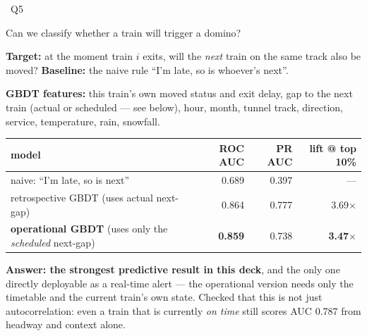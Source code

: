 \documentclass[aspectratio=169,10pt]{beamer}
\newcommand{\srcnote}[1]{{\scriptsize\color{ink3}#1}}
\newcommand{\qtag}[1]{{\scriptsize\color{surface}\colorbox{cblue}{\strut~Q#1~}}}
\begin{document}
\begin{frame}{\qtag{5} Can we classify whether a train will trigger a domino?}
  \textbf{Target:} at the moment train $i$ exits, will the \emph{next} train on the
  same track also be moved? \textbf{Baseline:} the naive rule ``I'm late, so is
  whoever's next''.

  \vspace{0.3em}
  \srcnote{\textbf{GBDT features:} this train's own moved status and exit delay,
  gap to the next train \srcnote{(actual or scheduled --- see below)}, hour,
  month, tunnel track, direction, service, temperature, rain, snowfall.}

  \vspace{0.4em}
  \centering
  \begin{tabular}{@{}lrrr@{}}
    \toprule
    model & ROC AUC & PR AUC & lift @ top 10\% \\
    \midrule
    naive: ``I'm late, so is next'' & 0.689 & 0.397 & --- \\
    retrospective GBDT \srcnote{(uses actual next-gap)} & 0.864 & 0.777 & 3.69$\times$ \\
    \textbf{operational GBDT} \srcnote{(uses only the \emph{scheduled} next-gap)} & \textbf{0.859} & 0.738 & \textbf{3.47$\times$} \\
    \bottomrule
  \end{tabular}

  \vspace{0.6em}
  \textbf{Answer: the strongest predictive result in this deck}, and the only one
  directly deployable as a real-time alert --- the operational version needs only
  the timetable and the current train's own state. \srcnote{Checked that this is
  not just autocorrelation: even a train that is currently \emph{on time} still
  scores AUC 0.787 from headway and context alone.}
\end{frame}
\end{document}

